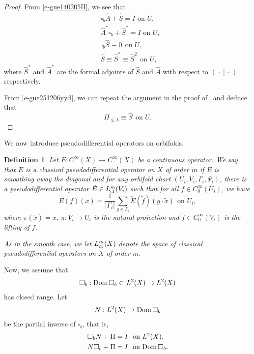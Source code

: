 \documentclass{article}
\newtheorem{definition}[theorem]{Definition}
\newcommand{\To}{\rightarrow}
\begin{document}
\begin{proof}
   From \eqref{e-gue140205II}, we see that 
 \begin{equation}\label{e-gue251206yyd}
			\begin{split}
				&\mbox{$\square_b\hat{A}+\hat{S}=I$ on $U$},\\
                &\mbox{$\hat{A}^*\square_b+\hat{S}^*=I$ on $U$},\\
				&\square_b\hat{S}\equiv0\ \ \mbox{on $U$},\\
				&\hat{S}\equiv \hat{S}^*\equiv \hat{S}^2\ \ \mbox{on $U$},
			\end{split}
		\end{equation}
		where $\hat{S}^*$ and $\hat{A}^*$ are the formal adjoints of $\hat{S}$ and $\hat{A}$
		with respect to $(\,\cdot\,|\,\cdot\,)$ respectively. 

From \eqref{e-gue251206yyd}, we can repeat the argument in the proof of~\cite[Theorem 1.5]{hsiaomari2} and deduce that 
\[\Pi_{\leq\lambda}\equiv\hat{S}\ \ \mbox{on $U$}.\]
\end{proof}

We now introduce pseudodifferential operators on orbifolds. 

\begin{definition}\label{d-gue251130yyd}
Let $E: C^\infty(X)\To C^\infty(X)$ be a continuous operator. We say that $E$ is a classical pseudodifferential operator on $X$ of order $m$ if $E$ is smoothing away the diagonal and for any orbifold chart $(U_i, V_i, \Gamma_i, \Psi_i)$, there is a pseudodifferential operator $\tilde E\in L^m_{{\rm cl\,}}(V_i)$ such that for all $f\in C^\infty_0(U_i)$, we have 
\[E(f)(x)=\frac{1}{|\Gamma_i|}\sum_{g\in\Gamma_i}\tilde E(\tilde f)(g\cdot\tilde x)\ \ \mbox{on $U_i$},\]
where $\pi(\tilde x)=x$, $\pi: V_i\rightarrow U_i$ is the natural projection and 
$\tilde f\in C^\infty_0(V_i)$ is the lifting of $f$. 

As in the smooth case, we let $L^m_{{\rm cl\,}}(X)$ denote the space of classical pseudodifferential operators on $X$ of order $m$. 
\end{definition} 


Now, we assume that 
\[\square_b: {\rm Dom\,}\square_b\subset L^2(X)\rightarrow L^2(X)\]
has closed range. Let 
\[N: L^2(X)\rightarrow {\rm Dom\,}\square_b\]
be the partial inverse of $\square_b$, that is, 
\begin{equation}\label{e-gue251206yyda}
\begin{split}
&\square_bN+\Pi=I\ \ \mbox{on $L^2(X)$},\\
&N\square_b+\Pi=I\ \ \mbox{on ${\rm Dom\,}\square_b$}.
\end{split}
\end{equation}
\end{document}
